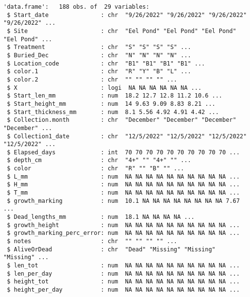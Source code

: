 \documentclass[
  letterpaper,
  DIV=11,
  numbers=noendperiod]{scrartcl}
\begin{document}
\begin{verbatim}
'data.frame':   188 obs. of  29 variables:
 $ Start_date               : chr  "9/26/2022" "9/26/2022" "9/26/2022" "9/26/2022" ...
 $ Site                     : chr  "Eel Pond" "Eel Pond" "Eel Pond" "Eel Pond" ...
 $ Treatment                : chr  "S" "S" "S" "S" ...
 $ Buried_Dec               : chr  "N" "N" "N" "N" ...
 $ Location_code            : chr  "B1" "B1" "B1" "B1" ...
 $ color.1                  : chr  "R" "Y" "B" "L" ...
 $ color.2                  : chr  "" "" "" "" ...
 $ X                        : logi  NA NA NA NA NA NA ...
 $ Start_len_mm             : num  18.2 12.7 12.8 11.2 10.6 ...
 $ Start_height_mm          : num  14 9.63 9.09 8.83 8.21 ...
 $ Start_thickness_mm       : num  8.1 5.56 4.92 4.91 4.42 ...
 $ Collection.month         : chr  "December" "December" "December" "December" ...
 $ Collection1_date         : chr  "12/5/2022" "12/5/2022" "12/5/2022" "12/5/2022" ...
 $ Elapsed_days             : int  70 70 70 70 70 70 70 70 70 70 ...
 $ depth_cm                 : chr  "4+" "" "4+" "" ...
 $ color                    : chr  "R" "" "B" "" ...
 $ L_mm                     : num  NA NA NA NA NA NA NA NA NA NA ...
 $ H_mm                     : num  NA NA NA NA NA NA NA NA NA NA ...
 $ T_mm                     : num  NA NA NA NA NA NA NA NA NA NA ...
 $ growth_marking           : num  10.1 NA NA NA NA NA NA NA NA 7.67 ...
 $ Dead_lengths_mm          : num  18.1 NA NA NA NA ...
 $ growth_height            : num  NA NA NA NA NA NA NA NA NA NA ...
 $ growth_marking_perc_error: num  NA NA NA NA NA NA NA NA NA NA ...
 $ notes                    : chr  "" "" "" "" ...
 $ AliveOrDead              : chr  "Dead" "Missing" "Missing" "Missing" ...
 $ len_tot                  : num  NA NA NA NA NA NA NA NA NA NA ...
 $ len_per_day              : num  NA NA NA NA NA NA NA NA NA NA ...
 $ height_tot               : num  NA NA NA NA NA NA NA NA NA NA ...
 $ height_per_day           : num  NA NA NA NA NA NA NA NA NA NA ...
\end{verbatim}
\end{document}
